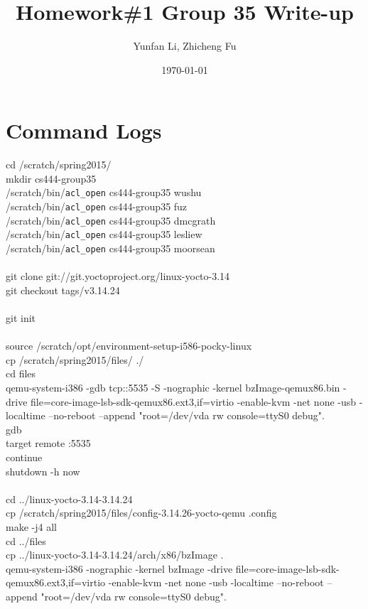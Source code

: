 \documentclass[letterpaper,10pt,titlepage]{article}
\begin{document}
\title{Homework\#1 Group 35 Write-up}
\author{Yunfan Li, Zhicheng Fu}
\date{\today}
\maketitle

\section{Command Logs}
cd /scratch/spring2015/ \\
mkdir cs444-group35 \\
/scratch/bin/\verb|acl_open| cs444-group35 wushu \\
/scratch/bin/\verb|acl_open| cs444-group35 fuz \\
/scratch/bin/\verb|acl_open| cs444-group35 dmcgrath \\
/scratch/bin/\verb|acl_open| cs444-group35 lesliew \\
/scratch/bin/\verb|acl_open| cs444-group35 moorsean \\
\\
git clone git://git.yoctoproject.org/linux-yocto-3.14 \\
git checkout tags/v3.14.24 \\
\\
git init \\
\\
source /scratch/opt/environment-setup-i586-pocky-linux \\
cp /scratch/spring2015/files/ ./ \\
cd files \\
qemu-system-i386 -gdb tcp::5535 -S -nographic -kernel bzImage-qemux86.bin -drive file=core-image-lsb-sdk-qemux86.ext3,if=virtio -enable-kvm -net none -usb -localtime --no-reboot --append "root=/dev/vda rw console=ttyS0 debug". \\
gdb \\
target remote :5535 \\
continue \\
shutdown -h now \\
\\
cd ../linux-yocto-3.14-3.14.24 \\
cp /scratch/spring2015/files/config-3.14.26-yocto-qemu .config \\
make -j4 all \\
cd ../files \\
cp ../linux-yocto-3.14-3.14.24/arch/x86/bzImage . \\
qemu-system-i386 -nographic -kernel bzImage -drive file=core-image-lsb-sdk-qemux86.ext3,if=virtio -enable-kvm -net none -usb -localtime --no-reboot --append "root=/dev/vda rw console=ttyS0 debug". \\
\end{document}
